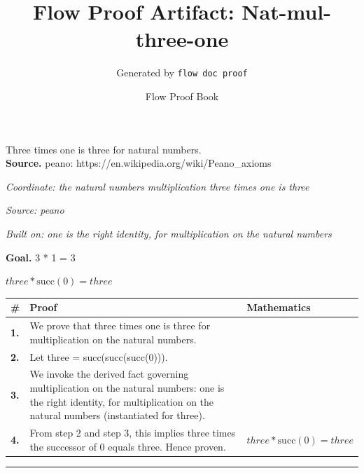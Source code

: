 \documentclass[11pt]{article}
\title{Flow Proof Artifact: Nat-mul-three-one}
\author{Generated by \texttt{flow doc proof}}
\date{Flow Proof Book}
\theoremstyle{definition}
\begin{document}
\maketitle
Three times one is three for natural numbers.\\[0.5em]
\textbf{Source.} peano: https://en.wikipedia.org/wiki/Peano\_axioms\\[0.5em]
\bigskip
{}\par
\smallskip\noindent\textit{Coordinate: the natural numbers \cdot multiplication \cdot three times one is three}\par
\smallskip\noindent\textit{Source: peano}\par
\smallskip\noindent\textit{Built on: one is the right identity, for multiplication on the natural numbers}\par
\medskip
\noindent\textbf{Goal.} 3 * 1 = 3\par
\noindent$\displaystyle three * \mathrm{succ}(0) = three$\par
\medskip
\noindent
\begin{tabular}{@{} >{\raggedright\arraybackslash}p{} >{\raggedright\arraybackslash}p{} >{\raggedleft\arraybackslash}p{} @{}}
\textbf{\#} & \textbf{Proof} & \textbf{Mathematics} \\
\midrule
\textbf{1.} & We prove that three times one is three for multiplication on the natural numbers. & \\[0.45em]
\textbf{2.} & Let three = succ(succ(succ(0))). & \\[0.45em]
\textbf{3.} & We invoke the derived fact governing multiplication on the natural numbers: one is the right identity, for multiplication on the natural numbers (instantiated for three). & \\[0.45em]
\textbf{4.} & From step 2 and step 3, this implies three times the successor of 0 equals three. Hence proven. & $\displaystyle three * \mathrm{succ}(0) = three$ \\[0.45em]
\bottomrule
\end{tabular}
\label{thm:Nat-multiplication-three_times_one_is_three}
\par\medskip\hrule
\end{document}
